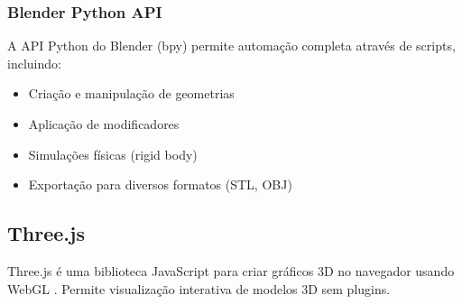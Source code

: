 \subsubsection{Blender Python API}

A API Python do Blender (bpy) permite automação completa através de scripts, incluindo:

\begin{itemize}
    \item Criação e manipulação de geometrias
    \item Aplicação de modificadores
    \item Simulações físicas (rigid body)
    \item Exportação para diversos formatos (STL, OBJ)
\end{itemize}

\subsection{Three.js}

Three.js é uma biblioteca JavaScript para criar gráficos 3D no navegador usando WebGL \cite{threejs2021}. Permite visualização interativa de modelos 3D sem plugins.

